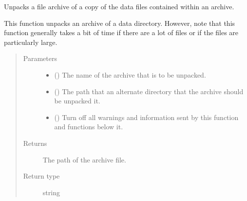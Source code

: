\documentclass[letterpaper,10pt,english]{sphinxmanual}
\begin{document}
\begin{fulllineitems}
\label{\detokenize{docstrings/ifa_smeargle.core.io:ifa_smeargle.core.io.dearchive_data_directory}}
Unpacks a file archive of a copy of the data files contained
within an archive.

This function unpacks an archive of a data directory. However,
note that this function generally takes a bit of time if there
are a lot of files or if the files are particularly large.
\begin{quote}\begin{description}
\item[{Parameters}] \leavevmode\begin{itemize}
\item {} 
 () \textendash{} The name of the archive that is to be unpacked.

\item {} 
 () \textendash{} The path that an alternate directory that the archive should
be unpacked it.

\item {} 
 (\sphinxstyleliteralemphasis{\sphinxupquote{ (}}\sphinxstyleliteralemphasis{\sphinxupquote{)}}) \textendash{} Turn off all warnings and information sent by this function
and functions below it.

\end{itemize}

\item[{Returns}] \leavevmode
{} \textendash{} The path of the archive file.

\item[{Return type}] \leavevmode
string

\end{description}\end{quote}

\end{fulllineitems}

\end{document}
